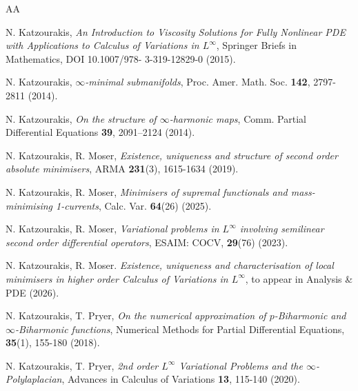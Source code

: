 \documentclass[a4paper,11pt]{article}
\numberwithin{equation}{section}
\theoremstyle{definition}
\begin{document}
\begin{thebibliography}{AA}

N. Katzourakis, {\it An Introduction to Viscosity Solutions for Fully Nonlinear PDE with Applications
to Calculus of Variations in $L^\infty$}, Springer Briefs in Mathematics,  DOI 10.1007/978-
3-319-12829-0 (2015).

N. Katzourakis, {\it $\infty$-minimal submanifolds}, Proc. Amer. Math. Soc. {\bf 142}, 2797-2811 (2014).

N. Katzourakis, {\it On the structure of $\infty$-harmonic maps}, Comm. Partial Differential
Equations {\bf 39}, 2091–2124 (2014).



N. Katzourakis, R. Moser, {\it Existence, uniqueness and structure of second order absolute minimisers}, ARMA {\bf 231}(3), 1615-1634 (2019).

N. Katzourakis, R. Moser, {\it Minimisers of supremal functionals and mass-minimising 1-currents}, Calc. Var.{ \bf 64}(26) (2025).

N. Katzourakis, R. Moser, {\it Variational problems in $L^\infty$ involving semilinear second order differential operators}, ESAIM: COCV, {\bf 29}(76) (2023).

N. Katzourakis, R. Moser. {\it Existence, uniqueness and characterisation of local minimisers in higher order Calculus of Variations in $L^\infty$}, to appear in Analysis \& PDE (2026).

N. Katzourakis, T. Pryer, {\it On the numerical approximation of $p$-Biharmonic and $\infty$-Biharmonic functions},
Numerical Methods for Partial Differential Equations, {\bf 35}(1), 155-180 (2018).


N. Katzourakis, T. Pryer, {\it 2nd order $L^\infty$ Variational Problems and the $\infty$-Polylaplacian},
Advances in Calculus of Variations {\bf 13}, 115-140 (2020).




\end{thebibliography}
\end{document}
